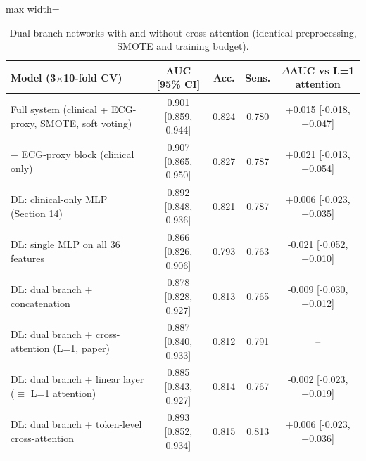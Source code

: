 \begin{table}[!t]
\centering
\scriptsize
\caption{Dual-branch networks with and without cross-attention (identical preprocessing, SMOTE and training budget).}
\label{tab:e9}
\setlength{\tabcolsep}{3pt}
\begin{adjustbox}{max width=\linewidth}
\begin{tabular}{lcccc}
\toprule
Model (3$\times$10-fold CV) & AUC [95\% CI] & Acc. & Sens. & $\Delta$AUC vs L=1 attention \\
\midrule
Full system (clinical + ECG-proxy, SMOTE, soft voting) & 0.901 [0.859, 0.944] & 0.824 & 0.780 & +0.015 [-0.018, +0.047] \\
$-$ ECG-proxy block (clinical only) & 0.907 [0.865, 0.950] & 0.827 & 0.787 & +0.021 [-0.013, +0.054] \\
DL: clinical-only MLP (Section 14) & 0.892 [0.848, 0.936] & 0.821 & 0.787 & +0.006 [-0.023, +0.035] \\
DL: single MLP on all 36 features & 0.866 [0.826, 0.906] & 0.793 & 0.763 & -0.021 [-0.052, +0.010] \\
DL: dual branch + concatenation & 0.878 [0.828, 0.927] & 0.813 & 0.765 & -0.009 [-0.030, +0.012] \\
DL: dual branch + cross-attention (L=1, paper) & 0.887 [0.840, 0.933] & 0.812 & 0.791 & -- \\
DL: dual branch + linear layer ($\equiv$ L=1 attention) & 0.885 [0.843, 0.927] & 0.814 & 0.767 & -0.002 [-0.023, +0.019] \\
DL: dual branch + token-level cross-attention & 0.893 [0.852, 0.934] & 0.815 & 0.813 & +0.006 [-0.023, +0.036] \\
\bottomrule
\end{tabular}
\end{adjustbox}
\end{table}
